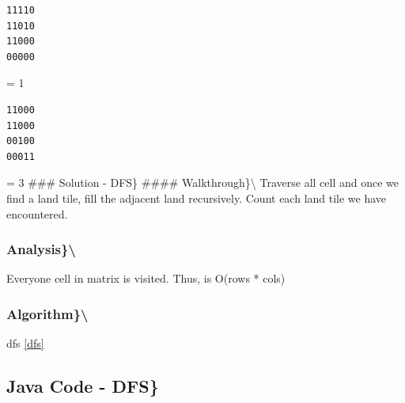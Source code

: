 \documentclass[]{book}
\begin{document}
\begin{verbatim}
11110
11010
11000
00000
\end{verbatim}

= 1

\begin{verbatim}
11000
11000
00100
00011
\end{verbatim}

= 3
\#\#\# Solution - DFS\}
\#\#\#\# Walkthrough\}\textbackslash{}
Traverse all cell and once we find a land tile, fill the adjacent land recursively. Count each land tile we have
encountered.

\hypertarget{analysis-54}{%
\subsubsection{Analysis\}\textbackslash{}}\label{analysis-54}}

Everyone cell in matrix is visited. Thus, is O(rows * cols)

\hypertarget{algorithm-54}{%
\subsubsection{Algorithm\}\textbackslash{}}\label{algorithm-54}}

dfs \ref{dfs}

\hypertarget{java-code---dfs-1}{%
\subsection{Java Code - DFS\}}\label{java-code---dfs-1}}
\end{document}
